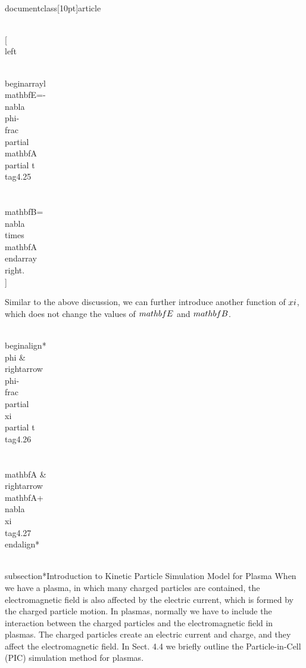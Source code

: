 \\documentclass[10pt]{article}
\begin{document}
\\[
\\left\\{\\begin{array}{l}
\\mathbf{E}=-\\nabla \\phi-\\frac{\\partial \\mathbf{A}}{\\partial t}  \\tag{4.25}\\\\
\\mathbf{B}=\\nabla \\times \\mathbf{A}
\\end{array}\\right.
\\]

Similar to the above discussion, we can further introduce another function of $\\xi$, which does not change the values of $\\mathbf{E}$ and $\\mathbf{B}$.


\\begin{align*}
\\phi & \\rightarrow \\phi-\\frac{\\partial \\xi}{\\partial t}  \\tag{4.26}\\\\
\\mathbf{A} & \\rightarrow \\mathbf{A}+\\nabla \\xi \\tag{4.27}
\\end{align*}


\\subsection*{Introduction to Kinetic Particle Simulation Model for Plasma}
When we have a plasma, in which many charged particles are contained, the electromagnetic field is also affected by the electric current, which is formed by the charged particle motion. In plasmas, normally we have to include the interaction between the charged particles and the electromagnetic field in plasmas. The charged particles create an electric current and charge, and they affect the electromagnetic field. In Sect. 4.4 we briefly outline the Particle-in-Cell (PIC) simulation method for plasmas.

}
\end{document}
